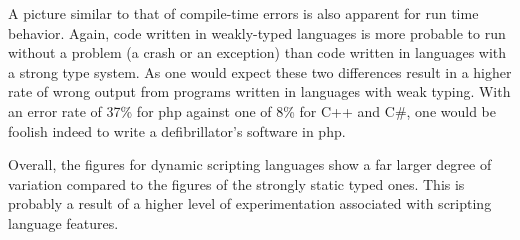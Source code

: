 \documentclass[10pt]{sigplanconf}
\begin{document}
A picture similar to that of compile-time errors
is also apparent for run time behavior.
Again, code written in weakly-typed languages is more probable to run without
a problem (a crash or an exception)
than code written in languages with a strong type system.
As one would expect these two differences result in a higher rate of
wrong output from programs written in languages with weak typing.
With an error rate of 37\% for {\sc php} against one of 8\% for
C++ and C\#, one would be foolish indeed to write a defibrillator's
software in {\sc php}.

Overall, the figures for dynamic scripting languages show a far larger
degree of variation compared to the figures of the strongly static typed
ones.
This is probably a result of a higher level of experimentation
associated with scripting language features.
\end{document}
